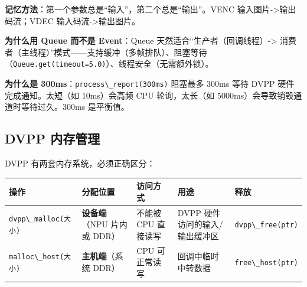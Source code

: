 \textbf{记忆方法}：第一个参数总是``输入''，第二个总是``输出''。VENC
输入图片-\textgreater 输出码流；VDEC 输入码流-\textgreater 输出图片。

\textbf{为什么用 Queue 而不是 Event}：Queue
天然适合``生产者（回调线程）-\textgreater{}
消费者（主线程）''模式------支持缓冲（多帧排队）、阻塞等待（\passthrough{\lstinline!Queue.get(timeout=5.0)!}）、线程安全（无需额外锁）。

\textbf{为什么是
300ms}：\passthrough{\lstinline!process\_report(300ms)!} 阻塞最多 300ms
等待 DVPP 硬件完成通知。太短（如 10ms）会高频 CPU 轮询，太长（如
5000ms）会导致销毁通道时等待过久。300ms 是平衡值。

\subsection{DVPP 内存管理}\label{src-book-chapter6-h4}

DVPP 有两套内存系统，必须正确区分：

\begin{longtable}[]{@{}
  >{\raggedright\arraybackslash}p{}
  >{\raggedright\arraybackslash}p{}
  >{\raggedright\arraybackslash}p{}
  >{\raggedright\arraybackslash}p{}
  >{\raggedright\arraybackslash}p{}@{}}
\toprule\noalign{}
\begin{minipage}[b]{\linewidth}\raggedright
操作
\end{minipage} & \begin{minipage}[b]{\linewidth}\raggedright
分配位置
\end{minipage} & \begin{minipage}[b]{\linewidth}\raggedright
访问方式
\end{minipage} & \begin{minipage}[b]{\linewidth}\raggedright
用途
\end{minipage} & \begin{minipage}[b]{\linewidth}\raggedright
释放
\end{minipage} \\
\midrule\noalign{}
\endhead
\bottomrule\noalign{}
\endlastfoot
\passthrough{\lstinline!dvpp\_malloc(大小)!} & \textbf{设备端}（NPU
片内或 DDR） & 不能被 CPU 直接读写 & DVPP 硬件访问的输入/输出缓冲区 &
\passthrough{\lstinline!dvpp\_free(ptr)!} \\
\passthrough{\lstinline!malloc\_host(大小)!} & \textbf{主机端}（系统
DDR） & CPU 可正常读写 & 回调中临时中转数据 &
\passthrough{\lstinline!free\_host(ptr)!} \\
\end{longtable}

